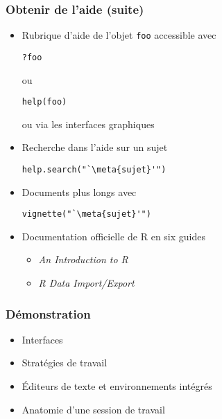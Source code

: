 \begin{frame}[fragile=singleslide]
  \frametitle{Obtenir de l'aide (suite)}

  \begin{itemize}
  \item Rubrique d'aide de l'objet \texttt{foo} accessible avec
    \begin{Schunk}
\begin{lstlisting}
?foo
\end{lstlisting}
    \end{Schunk}
    ou
    \begin{Schunk}
\begin{lstlisting}
help(foo)
\end{lstlisting}
    \end{Schunk}
    ou via les interfaces graphiques
  \item Recherche dans l'aide sur un sujet
    \begin{Schunk}
\begin{lstlisting}
help.search("`\meta{sujet}'")
\end{lstlisting}
    \end{Schunk}
  \item Documents plus longs avec
    \begin{Schunk}
\begin{lstlisting}
vignette("`\meta{sujet}'")
\end{lstlisting}
    \end{Schunk}
  \item Documentation officielle de R en six guides
    \begin{itemize}
    \item \emph{An Introduction to R}
    \item \emph{R Data Import/Export}
    \end{itemize}
  \end{itemize}
\end{frame}

\begin{frame}
  \frametitle{Démonstration}
  \begin{itemize}
  \item Interfaces
  \item Stratégies de travail
  \item Éditeurs de texte et environnements intégrés
  \item Anatomie d'une session de travail
  \end{itemize}

\end{frame}

